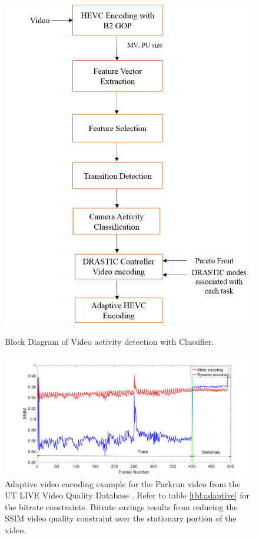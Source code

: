 \documentclass{book}
\begin{document}
\begin{figure}[hbt!]
	\centering
	{\includegraphics[width=0.95\linewidth]{pictures/ch3/pic1.png}
		\label{fig:blkdia1}}
	\caption{Block Diagram of Video activity detection with Classifier.}
\end{figure}

\begin{figure}
	\includegraphics[width=\linewidth, clip]{pictures/ch3/Pr_TrackingLessImportant.png}
	\caption{\label{fig:adaptiveEncPr}
		Adaptive video encoding example for the Parkrun video from the 
		UT LIVE Video Quality Database \cite{Kalpana}.
		Refer to table \ref{tbl:adaptive} for the bitrate constraints.
		Bitrate savings results from reducing the SSIM video quality
		constraint over the stationary portion of the video.
	}
\end{figure}
\end{document}
